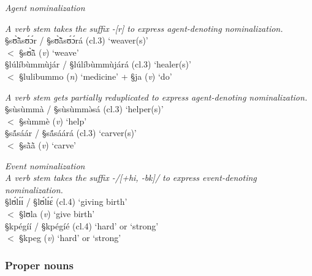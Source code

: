 \begin{exe}
 \ex\label{exːGRM-der-agent}{\it Agent nominalization}
\begin{xlist}
\ex\label{exːGRM-der-agent-suffix}
{\it A verb stem takes the suffix -[r]  to express agent-denoting
nominalization.} \\
{\S  sʊ̃̀ã̀sʊ́ɔ́r} / {\S sʊ̃̀ã̀sʊ́ɔ́rá} ({\sc cl.3}) `weaver(s)' \\
 $<$  {\S sʊ̃̀ã̀} ({\it v}) `weave'\\
{\S  lúlíbùmmùjár} / {\S lúlíbùmmùjárá} ({\sc cl.3})  `healer(s)' \\
$<$ {\S lulibummo} ({\it n}) `medicine' + {\S ja} ({\it v}) `do'


 \ex\label{exːGRM-der-agent-redup}
{\it A verb stem gets partially reduplicated   to express
agent-denoting nominalization.} \\
{\S  sùsùmmà} / {\S sùsùmmə̀sá} ({\sc cl.3})  `helper(s)' \\
$<$ {\S sùmmè} ({\it v}) `help' \\
{\S  sã́sáár} / {\S sã́sáárá} ({\sc cl.3})  `carver(s)' \\
$<$ {\S sã̀ã̀} ({\it v}) `carve' 

\end{xlist}
\end{exe}


\begin{exe}
 \ex\label{exːGRM-der-action}{\it Event nominalization}\\
{\it A verb stem takes the suffix -/[{\sc +hi, -bk}]/   to express
event-denoting
nominalization.} \\
{\S lʊ́lɪ́ɪ́ } / {\S  lʊ́lɪ́ɛ́} ({\sc cl.4}) `giving birth'  \\
 $<$ {\S  lʊla} ({\it v}) `give birth'\\
{\S kpégíí} / {\S   kpégíé}  ({\sc cl.4})  `hard'  or
`strong' \\
 $<$ {\S  kpeg} ({\it v}) `hard' or `strong'\\

\end{exe}

\subsubsection{Proper nouns}
\label{sec:GRM-prop-noun}

% 


